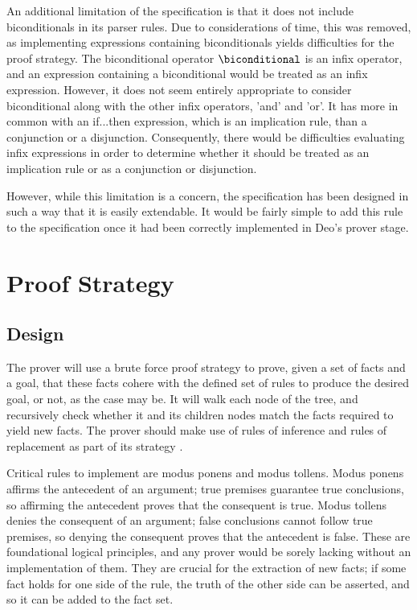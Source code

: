 \documentclass{l4proj}
\begin{document}
An additional limitation of the specification is that it does not include biconditionals in its parser rules. Due to considerations of time, this was removed, as implementing expressions containing biconditionals yields difficulties for the proof strategy. The biconditional operator $\biconditional$ is an infix operator, and an expression containing a biconditional would be treated as an infix expression. However, it does not seem entirely appropriate to consider biconditional along with the other infix operators, 'and' and 'or'. It has more in common with an if...then expression, which is an implication rule, than a conjunction or a disjunction. Consequently, there would be difficulties evaluating infix expressions in order to determine whether it should be treated as an implication rule or as a conjunction or disjunction. 

However, while this limitation is a concern, the specification has been designed in such a way that it is easily extendable. It would be fairly simple to add this rule to the specification once it had been correctly implemented in Deo's prover stage. 

\section{Proof Strategy}

\subsection{Design}
The prover will use a brute force proof strategy to prove, given a set of facts and a goal, that these facts cohere with the defined set of rules to produce the desired goal, or not, as the case may be. It will walk each node of the tree, and recursively check whether it and its children nodes match the facts required to yield new facts. The prover should make use of rules of inference and rules of replacement as part of its strategy \cite{infrules}. 

Critical rules to implement are modus ponens and modus tollens. Modus ponens affirms the antecedent of an argument; true premises guarantee true conclusions, so affirming the antecedent proves that the consequent is true. Modus tollens denies the consequent of an argument; false conclusions cannot follow true premises, so denying the consequent proves that the antecedent is false. These are foundational logical principles, and any prover would be sorely lacking without an implementation of them. They are crucial for the extraction of new facts; if some fact holds for one side of the rule, the truth of the other side can be asserted, and so it can be added to the fact set. 
\end{document}
